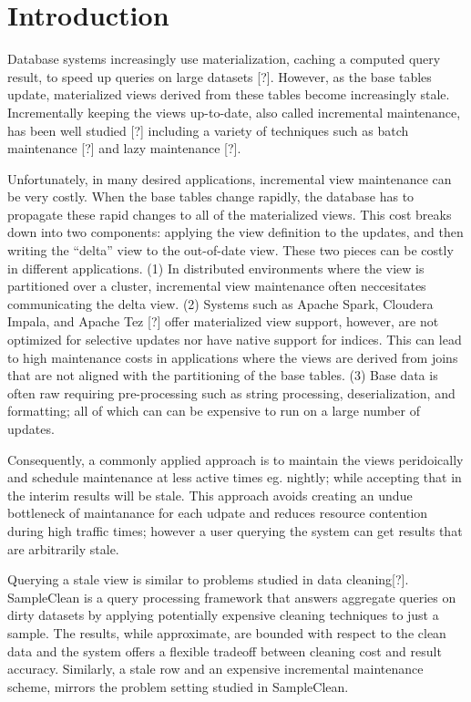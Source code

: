 \section{Introduction}
Database systems increasingly use materialization, caching a computed
query result, to speed up queries on large datasets {[}?{]}. However,
as the base tables update, materialized views derived from these tables
become increasingly stale. Incrementally keeping the views up-to-date,
also called incremental maintenance, has been well studied {[}?{]}
including a variety of techniques such as batch maintenance {[}?{]}
and lazy maintenance {[}?{]}. 

Unfortunately, in many desired applications, incremental view maintenance
can be very costly. 
When the base tables change rapidly, the database has to propagate these rapid changes to
all of the materialized views.  
This cost breaks down into two components: applying
the view definition to the updates, and then writing the ``delta''
view to the out-of-date view. These two pieces can be costly in different
applications. (1) In distributed environments where the view is partitioned
over a cluster, incremental view maintenance often neccesitates communicating
the delta view. (2) Systems such as Apache Spark, Cloudera Impala,
and Apache Tez {[}?{]} offer materialized view support, however, are
not optimized for selective updates nor have native support for indices.
This can lead to high maintenance costs in applications where the
views are derived from joins that are not aligned with the partitioning
of the base tables. (3) Base data is often raw requiring pre-processing
such as string processing, deserialization, and formatting; all of
which can can be expensive to run on a large number of updates. 

Consequently, a commonly applied approach is to maintain the views peridoically and
schedule maintenance at less active times eg. nightly; while accepting
that in the interim results will be stale. This approach avoids creating
an undue bottleneck of maintanance for each udpate and reduces resource contention during high traffic times; 
however a user querying the system can get results that are arbitrarily stale.

Querying a stale view is similar to problems studied in data cleaning{[}?{]}.
SampleClean is a query processing framework that answers aggregate
queries on dirty datasets by applying potentially expensive cleaning
techniques to just a sample. The results, while approximate, are bounded
with respect to the clean data and the system offers a flexible tradeoff
between cleaning cost and result accuracy. Similarly, a stale row
and an expensive incremental maintenance scheme, mirrors the problem
setting studied in SampleClean. 

